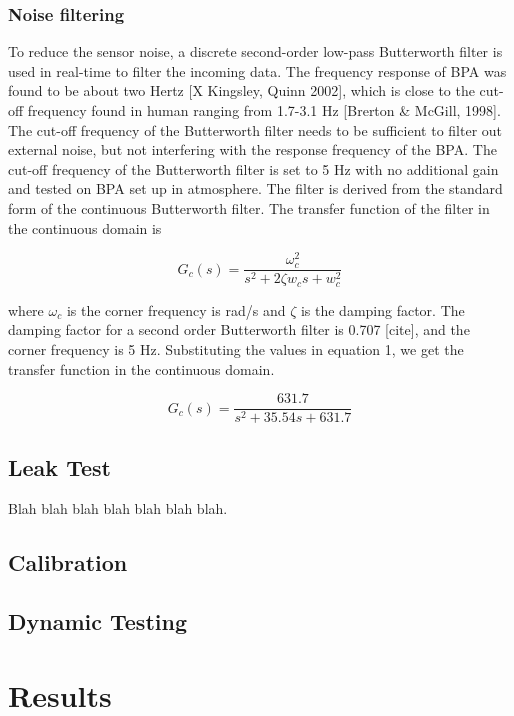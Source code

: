 \documentclass[letterpaper,11pt]{article}
\begin{document}
\subsubsection{Noise filtering}

To reduce the sensor noise, a discrete second-order low-pass Butterworth filter is used in real-time to filter the incoming data. The frequency response of BPA was found to be about two Hertz [X Kingsley, Quinn 2002], which is close to the cut-off frequency found in human ranging from 1.7-3.1 Hz [Brerton \& McGill, 1998]. The cut-off frequency of the Butterworth filter needs to be sufficient to filter out external noise, but not interfering with the response frequency of the BPA. The cut-off frequency of the Butterworth filter is set to 5 Hz with no additional gain and tested on BPA set up in atmosphere. The filter is derived from the standard form of the continuous Butterworth filter. The transfer function of the filter in the continuous domain is

\begin{equation}
    G_c(s)=\frac{\omega^2_c}{s^2+2 \zeta w_cs+w^2_c}
\end{equation}

where $\omega_c$ is the corner frequency is rad/s and $\zeta$ is the damping factor. The damping factor for a second order Butterworth filter is 0.707 [cite], and the corner frequency is 5 Hz. Substituting the values in equation 1, we get the transfer function in the continuous domain.

\begin{equation}
    G_c(s)=\frac{631.7}{s^2+35.54s+631.7}
\end{equation}

\subsection{Leak Test}

Blah blah blah \cite{jordan} blah blah blah blah.

\subsection{Calibration}

\subsection{Dynamic Testing}

\section{Results}
\end{document}
